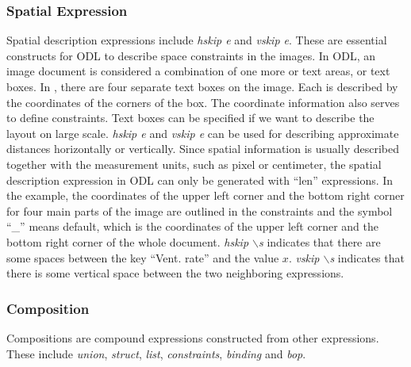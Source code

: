 \subsubsection{Spatial Expression}
Spatial description expressions include %
{\em hskip e} and {\em vskip e}. 
These are essential constructs for ODL to describe space constraints 
in the images. 
In ODL, an image document is considered a combination of 
one more or text areas, or text boxes. In , 
there are four separate text boxes on the image. 
Each is described by the coordinates of 
the corners of the box. The coordinate information also serves to define 
constraints. Text boxes can be specified if we want 
to describe the layout on large scale. 
{\em hskip e} and {\em vskip e} can be used for describing 
approximate distances horizontally or vertically. 
Since spatial information is usually described together with the 
measurement units, such as pixel or centimeter, 
the spatial description expression in ODL can only 
be generated with ``len'' expressions. 
In the example, the coordinates of the upper left corner and 
the bottom right corner for four main parts of the image are outlined in the 
constraints and the symbol ``\_'' means default, which is the 
coordinates of the upper left corner and the bottom right corner of the 
whole document. {\em hskip $\backslash$s} indicates that there are some spaces 
between the key ``Vent. rate'' and the value $x$. {\em vskip $\backslash$s} 
indicates that there is some vertical space between the two neighboring
expressions. 

\subsubsection{Composition}
Compositions are compound expressions constructed from other
expressions. These include 
{\em union}, {\em struct}, {\em list}, 
{\em constraints}, {\em binding} and {\em bop}.

